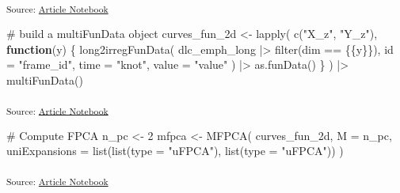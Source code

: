 \documentclass[
]{interact}
\newenvironment{Shaded}{\begin{snugshade}}{\end{snugshade}}
\newcommand{\AttributeTok}[1]{\textcolor[rgb]{0.40,0.45,0.13}{#1}}
\newcommand{\CommentTok}[1]{\textcolor[rgb]{0.37,0.37,0.37}{#1}}
\newcommand{\ControlFlowTok}[1]{\textcolor[rgb]{0.00,0.23,0.31}{\textbf{#1}}}
\newcommand{\DecValTok}[1]{\textcolor[rgb]{0.68,0.00,0.00}{#1}}
\newcommand{\FunctionTok}[1]{\textcolor[rgb]{0.28,0.35,0.67}{#1}}
\newcommand{\NormalTok}[1]{\textcolor[rgb]{0.00,0.23,0.31}{#1}}
\newcommand{\OtherTok}[1]{\textcolor[rgb]{0.00,0.23,0.31}{#1}}
\newcommand{\SpecialCharTok}[1]{\textcolor[rgb]{0.37,0.37,0.37}{#1}}
\newcommand{\StringTok}[1]{\textcolor[rgb]{0.13,0.47,0.30}{#1}}
\begin{document}
\textsubscript{Source:
\href{https://stefanocoretta.github.io/mv_uti/index.qmd.html}{Article
Notebook}}

\begin{Shaded}
\begin{Highlighting}[]
\CommentTok{\# build a multiFunData object}
\NormalTok{curves\_fun\_2d }\OtherTok{\textless{}{-}} \FunctionTok{lapply}\NormalTok{(}
  \FunctionTok{c}\NormalTok{(}\StringTok{"X\_z"}\NormalTok{, }\StringTok{"Y\_z"}\NormalTok{),}
  \ControlFlowTok{function}\NormalTok{(y) \{}
    \FunctionTok{long2irregFunData}\NormalTok{(}
\NormalTok{      dlc\_emph\_long }\SpecialCharTok{|\textgreater{}} \FunctionTok{filter}\NormalTok{(dim }\SpecialCharTok{==}\NormalTok{ \{\{y\}\}),}
      \AttributeTok{id =} \StringTok{"frame\_id"}\NormalTok{,}
      \AttributeTok{time =} \StringTok{"knot"}\NormalTok{,}
      \AttributeTok{value =} \StringTok{"value"}
\NormalTok{    ) }\SpecialCharTok{|\textgreater{}} 
    \FunctionTok{as.funData}\NormalTok{()}
\NormalTok{  \}}
\NormalTok{) }\SpecialCharTok{|\textgreater{}} 
  \FunctionTok{multiFunData}\NormalTok{()}
\end{Highlighting}
\end{Shaded}

\textsubscript{Source:
\href{https://stefanocoretta.github.io/mv_uti/index.qmd.html}{Article
Notebook}}

\begin{Shaded}
\begin{Highlighting}[]
\CommentTok{\# Compute FPCA}
\NormalTok{n\_pc }\OtherTok{\textless{}{-}} \DecValTok{2}
\NormalTok{mfpca }\OtherTok{\textless{}{-}} \FunctionTok{MFPCA}\NormalTok{(}
\NormalTok{  curves\_fun\_2d,}
  \AttributeTok{M =}\NormalTok{ n\_pc,}
  \AttributeTok{uniExpansions =} \FunctionTok{list}\NormalTok{(}\FunctionTok{list}\NormalTok{(}\AttributeTok{type =} \StringTok{"uFPCA"}\NormalTok{), }\FunctionTok{list}\NormalTok{(}\AttributeTok{type =} \StringTok{"uFPCA"}\NormalTok{))}
\NormalTok{)}
\end{Highlighting}
\end{Shaded}

\textsubscript{Source:
\href{https://stefanocoretta.github.io/mv_uti/index.qmd.html}{Article
Notebook}}

\begin{Shaded}
\end{Shaded}
\end{document}
